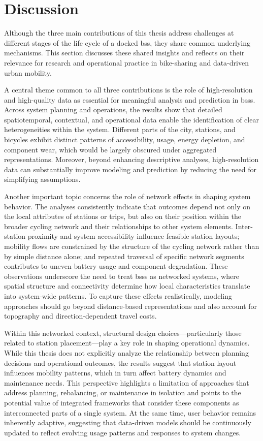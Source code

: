\section{Discussion}

Although the three main contributions of this thesis address challenges at different stages of the life cycle of a docked \ac{bss}, they share common underlying mechanisms. This section discusses these shared insights and reflects on their relevance for research and operational practice in bike-sharing and data-driven urban mobility.

A central theme common to all three contributions is the role of high-resolution and high-quality data as essential for meaningful analysis and prediction in \acp{bss}. Across system planning and operations, the results show that detailed spatiotemporal, contextual, and operational data enable the identification of clear heterogeneities within the system. Different parts of the city, stations, and bicycles exhibit distinct patterns of accessibility, usage, energy depletion, and component wear, which would be largely obscured under aggregated representations. Moreover, beyond enhancing descriptive analyses, high-resolution data can substantially improve modeling and prediction by reducing the need for simplifying assumptions.

Another important topic concerns the role of network effects in shaping system behavior. The analyses consistently indicate that outcomes depend not only on the local attributes of stations or trips, but also on their position within the broader cycling network and their relationships to other system elements. Inter-station proximity and system accessibility influence feasible station layouts; mobility flows are constrained by the structure of the cycling network rather than by simple distance alone; and repeated traversal of specific network segments contributes to uneven battery usage and component degradation. These observations underscore the need to treat \acp{bss} as networked systems, where spatial structure and connectivity determine how local characteristics translate into system-wide patterns. To capture these effects realistically, modeling approaches should go beyond distance-based representations and also account for topography and direction-dependent travel costs.

Within this networked context, structural design choices—particularly those related to station placement—play a key role in shaping operational dynamics. While this thesis does not explicitly analyze the relationship between planning decisions and operational outcomes, the results suggest that station layout influences mobility patterns, which in turn affect battery dynamics and maintenance needs. This perspective highlights a limitation of approaches that address planning, rebalancing, or maintenance in isolation and points to the potential value of integrated frameworks that consider these components as interconnected parts of a single system. At the same time, user behavior remains inherently adaptive, suggesting that data-driven models should be continuously updated to reflect evolving usage patterns and responses to system changes.


